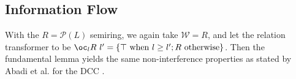 \subsection{Information Flow}
With the $R = \mathcal{P}(L)$ semiring,
we again take $\mathcal{W} = R$, and let the relation transformer to
be
$\oc_l R~l' = \{\top~\textrm{when }l \geq l'; R~\textrm{otherwise}\}$.
Then the fundamental lemma yields the same non-interference properties
as stated by Abadi et al. for the DCC \cite{abadi99core}.